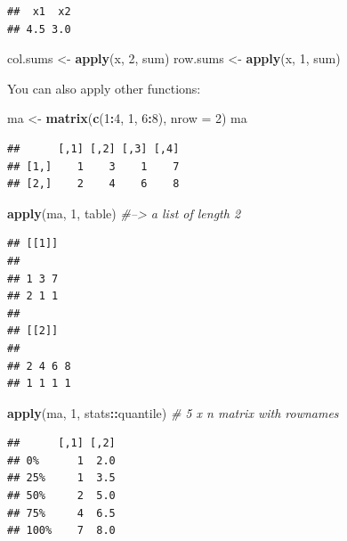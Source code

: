 \documentclass[12pt,]{krantz}
\makeatletter
\newenvironment{Shaded}{\begin{snugshade}}{\end{snugshade}}
\newcommand{\CommentTok}[1]{\textcolor[rgb]{0.37,0.37,0.37}{\textit{#1}}}
\newcommand{\DataTypeTok}[1]{\textcolor[rgb]{0.27,0.27,0.27}{#1}}
\newcommand{\DecValTok}[1]{\textcolor[rgb]{0.06,0.06,0.06}{#1}}
\newcommand{\KeywordTok}[1]{\textcolor[rgb]{0.27,0.27,0.27}{\textbf{#1}}}
\newcommand{\NormalTok}[1]{#1}
\newcommand{\OperatorTok}[1]{\textcolor[rgb]{0.43,0.43,0.43}{\textbf{#1}}}
\newcommand{\StringTok}[1]{\textcolor[rgb]{0.5,0.5,0.5}{#1}}
\newenvironment{kframe}{%
\medskip{}
\setlength{\fboxsep}{.8em}
 \def\at@end@of@kframe{}%
 \ifinner\ifhmode%
  \def\at@end@of@kframe{\end{minipage}}%
  \begin{minipage}{\columnwidth}%
 \fi\fi%
 \def\FrameCommand##1{\hskip\@totalleftmargin \hskip-\fboxsep
 \colorbox{shadecolor}{##1}\hskip-\fboxsep
     \hskip-\linewidth \hskip-\@totalleftmargin \hskip\columnwidth}%
 \MakeFramed {\advance\hsize-\width
   \@totalleftmargin\z@ \linewidth\hsize
   \@setminipage}}%
 {\par\unskip\endMakeFramed%
 \at@end@of@kframe}
\renewenvironment{Shaded}{\begin{kframe}}{\end{kframe}}
\makeatother
\begin{document}
\begin{verbatim}
##  x1  x2 
## 4.5 3.0
\end{verbatim}

\begin{Shaded}
\begin{Highlighting}[]
\NormalTok{col.sums <-}\StringTok{ }\KeywordTok{apply}\NormalTok{(x, }\DecValTok{2}\NormalTok{, sum)}
\NormalTok{row.sums <-}\StringTok{ }\KeywordTok{apply}\NormalTok{(x, }\DecValTok{1}\NormalTok{, sum)}
\end{Highlighting}
\end{Shaded}

You can also apply other functions:

\begin{Shaded}
\begin{Highlighting}[]
\NormalTok{ma <-}\StringTok{ }\KeywordTok{matrix}\NormalTok{(}\KeywordTok{c}\NormalTok{(}\DecValTok{1}\OperatorTok{:}\DecValTok{4}\NormalTok{, }\DecValTok{1}\NormalTok{, }\DecValTok{6}\OperatorTok{:}\DecValTok{8}\NormalTok{), }\DataTypeTok{nrow =} \DecValTok{2}\NormalTok{)}
\NormalTok{ma}
\end{Highlighting}
\end{Shaded}

\begin{verbatim}
##      [,1] [,2] [,3] [,4]
## [1,]    1    3    1    7
## [2,]    2    4    6    8
\end{verbatim}

\begin{Shaded}
\begin{Highlighting}[]
\KeywordTok{apply}\NormalTok{(ma, }\DecValTok{1}\NormalTok{, table)  }\CommentTok{#--> a list of length 2}
\end{Highlighting}
\end{Shaded}

\begin{verbatim}
## [[1]]
## 
## 1 3 7 
## 2 1 1 
## 
## [[2]]
## 
## 2 4 6 8 
## 1 1 1 1
\end{verbatim}

\begin{Shaded}
\begin{Highlighting}[]
\KeywordTok{apply}\NormalTok{(ma, }\DecValTok{1}\NormalTok{, stats}\OperatorTok{::}\NormalTok{quantile) }\CommentTok{# 5 x n matrix with rownames}
\end{Highlighting}
\end{Shaded}

\begin{verbatim}
##      [,1] [,2]
## 0%      1  2.0
## 25%     1  3.5
## 50%     2  5.0
## 75%     4  6.5
## 100%    7  8.0
\end{verbatim}
\end{document}
